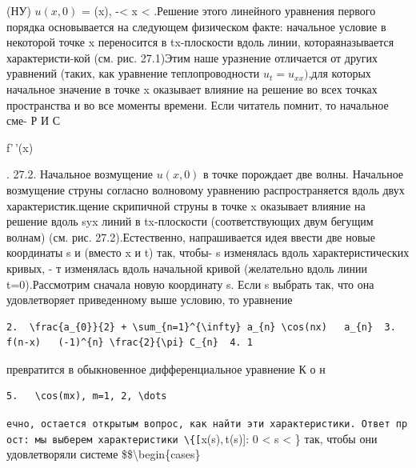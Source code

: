 \documentclass[
  ukrainian,
]{article}
\begin{document}
(НУ) \(u(x, 0)\) = \varphi(x), -\infty \textless{} x \textless{}
\infty.Решение этого линейного уравнения первого порядка основывается на
следующем физическом факте: начальное условие в некоторой точке x
переносится в tx-плоскости вдоль линии, котораяназывается
характеристи-кой (см. рис. 27.1)Этим наше уразнение отличается от других
уравнений (таких, как уравнение теплопроводности \(u_t = u_{xx} )\),для
которых начальное значение в точке x оказывает влияние на решение во
всех точках пространства и во все моменты времени. Если читатель помнит,
то начальное сме- Р И С

f'\,'(x)

. 27.2. Начальное возмущение \(u\left(x,0\right)\) в точке порождает две
волны. Начальное возмущение струны согласно волновому уравнению
распространяется вдоль двух характеристик.щение скрипичной струны в
точке x оказывает влияние на решение вдоль \partial syx линий в
tx-плоскости (соответствующих двум бегущим волнам) (см. рис.
27.2).Естественно, напрашивается идея ввести две новые координаты s и
\tau   (вместо x и t) так, чтобы- s изменялась вдоль характеристических
кривых, - т изменялась вдоль начальной кривой (желательно вдоль линии
t=0).Рассмотрим сначала новую координату s. Если s выбрать так, что она
удовлетворяет приведенному выше условию, то уравнение

\begin{verbatim}
2.  \frac{a_{0}}{2} + \sum_{n=1}^{\infty} a_{n} \cos(nx)   a_{n}  3.  f(n-x)   (-1)^{n} \frac{2}{\pi} C_{n}  4. 1
\end{verbatim}

превратится в обыкновенное дифференциальное уравнение К о н

\begin{verbatim}
5.   \cos(mx), m=1, 2, \dots
\end{verbatim}

\texttt{ечно,\ остается\ открытым\ вопрос,\ как\ найти\ эти\ характеристики.\ Ответ\ прост:\ мы\ выберем\ характеристики\ \textbackslash{}\{{[}}x(s)\(,\)t(s){]}:
0 \textless{} s \textless{} \infty\} так, чтобы они удовлетворяли
системе \$\$\textbackslash begin\{cases\}
\end{document}
